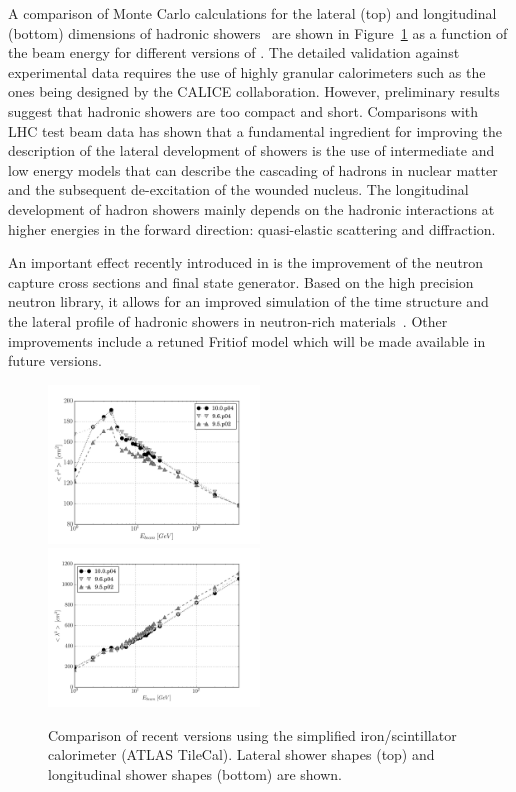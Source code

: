 A comparison of Monte Carlo calculations for the lateral (top) and longitudinal
(bottom) dimensions of hadronic showers~\cite{1742-6596-293-1-012022} are shown 
in Figure~\ref{fig:shapes} as a function of the beam energy for different 
versions of \Gfour{}. The detailed validation against experimental data requires 
the use of highly granular calorimeters such as the ones being designed by the 
CALICE collaboration. However, preliminary results suggest that \Gfour{} hadronic
showers are too compact and short.  Comparisons with LHC test beam data has 
shown that a fundamental ingredient for improving the description of the lateral 
development of showers is the use of intermediate and low energy models that 
can describe the cascading of hadrons in nuclear matter and the subsequent 
de-excitation of the wounded nucleus. The longitudinal development of hadron 
showers mainly depends on the hadronic interactions at higher energies in the 
forward direction: quasi-elastic scattering and diffraction.

An important effect recently introduced in \Gfour{} is the improvement of the
neutron capture cross sections and final state generator.  Based on the high
precision neutron library, it allows for an improved simulation of the time 
structure and the lateral profile of hadronic showers in neutron-rich 
materials~\cite{timestructure}. Other improvements include a retuned Fritiof
model which will be made available in future \Gfour{} versions.

 \begin{figure}[htb]
 \begin{center}
    \includegraphics[width=0.5\textwidth]{figures/lateral.pdf}
    \includegraphics[width=0.5\textwidth]{figures/longitudinal.pdf}
   \caption{Comparison of recent \Gfour{} versions using the simplified
            iron/scintillator calorimeter (ATLAS TileCal).  Lateral 
            shower shapes (top) and longitudinal shower
            shapes (bottom) are shown.}
   \label{fig:shapes}
 \end{center}
\end{figure}

